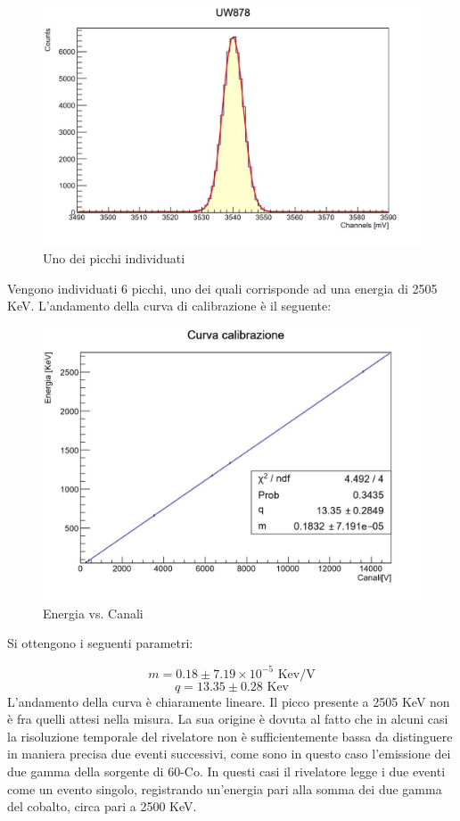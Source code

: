 \documentclass[a4paper,10pt]{article}
\newcommand*{\unit}[1]{\ensuremath{\mathrm{\,#1}}}
\begin{document}
\begin{figure}[H]
    \centering
    \includegraphics[scale=0.45]{grafici/piccouw878}
    \caption{Uno dei picchi individuati}
\end{figure}

Vengono individuati 6 picchi, uno dei quali corrisponde ad una energia di 2505 KeV. L'andamento della curva di calibrazione è il seguente:

\begin{figure}[H]
    \centering
    \includegraphics[scale=0.45]{grafici/rettacalibrazionemultigamma}
    \caption{Energia vs. Canali}
\end{figure}

Si ottengono i seguenti parametri:

$$
	m=0.18 \pm 7.19 \times 10^{-5}\, \unit{Kev/V}
$$
$$
	q=13.35 \pm 0.28\, \unit{Kev}
$$
L'andamento della curva è chiaramente lineare. Il picco presente a 2505 KeV non è fra quelli attesi nella misura. La sua origine è dovuta al fatto che in alcuni casi la risoluzione temporale del rivelatore non è sufficientemente bassa da distinguere in maniera precisa due eventi successivi, come sono in questo caso l'emissione dei due gamma della sorgente di 60-Co. In questi casi il rivelatore legge i due eventi come un evento singolo, registrando un'energia pari alla somma dei due gamma del cobalto, circa pari a 2500 KeV.
\end{document}
